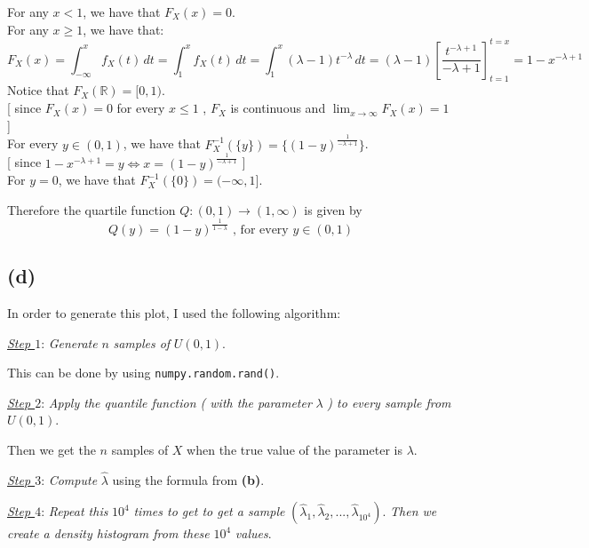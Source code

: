 \documentclass[11pt]{article}
\newcommand{\defaultindent}{\hspace{15pt}}
\newcommand{\subsectionindent}{\hspace{30pt}}
\begin{document}
For any $x < 1$, we have that $F_X (x) = 0$. 
\\ For any $x \ge 1$, we have that: 
\[
F_X (x) = \int_{- \infty}^{x} f_X ( t ) \, dt = \int_{1}^{x} f_X ( t ) \, dt 
= \int_{1}^{x} (\lambda - 1) t^{- \lambda} \, dt  
= (\lambda - 1) \left[ \frac{t ^ {- \lambda + 1}}{- \lambda + 1} \right]_{t=1}^{t=x}
= 1 - x^{- \lambda + 1}   
\]
Notice that $F_X ( \mathbb{R} ) = [0,1)$.
\\ \hspace*{\fill} [ since $F_X (x) = 0$ for every $x \le 1$ , $F_X$ is continuous and $\lim_{x \to \infty} F_X (x) = 1$ ] 
\\ For every $y \in (0,1)$, we have that $F_X ^{-1} ( \{ y \} ) = \{ (1 - y)^{\frac{1}{- \lambda + 1}} \}$. 
\\ \hspace*{\fill} [ since $1 - x^{- \lambda + 1} = y \Leftrightarrow x = (1 - y)^{\frac{1}{- \lambda + 1}}$ ]
\\ For $y = 0$, we have that $F_X ^{-1} ( \{ 0 \} ) = ( - \infty, 1]$.

\defaultindent Therefore the quartile function $Q : (0,1) \to (1, \infty)$ is given by 
\[
Q(y) = (1 - y)^{\frac{1}{1 - \lambda}} \text{ , for every } y \in (0,1)
\]


\subsection*{\subsectionindent (d)}

In order to generate this plot, I used the following algorithm:

\quad \textit{\underline{Step $1$}}: \textit{Generate} $n$ \textit{samples of} $U(0,1)$.

This can be done by using \verb+numpy.random.rand()+.

\quad \textit{\underline{Step $2$}}: \textit{Apply the quantile function ( with the parameter} $\lambda$ \textit{) to every sample from} $U(0,1)$.
 
Then we get the $n$ samples of $X$ when the true value of the parameter is $\lambda$.

\quad \textit{\underline{Step $3$}}: \textit{Compute} $\hat{\lambda}$ using the formula from \textbf{(b)}.

\quad \textit{\underline{Step $4$}}: \textit{Repeat this} $10^4$ \textit{times to get to get a sample} $(\hat{\lambda}_1, \hat{\lambda}_2, ... , \hat{\lambda}_{10 ^ 4})$. \textit{Then we create a density histogram from these} $10^4$ \textit{values}.
\end{document}
